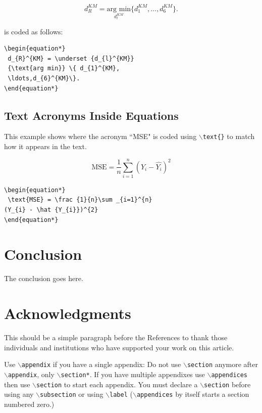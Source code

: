 \documentclass[lettersize,journal]{IEEEtran}
\begin{document}
\begin{equation*} 
  d_{R}^{KM} = \underset {d_{l}^{KM}} {\text{arg min}} \{ d_{1}^{KM},\ldots,d_{6}^{KM}\}.
\end{equation*}

\noindent is coded as follows:
\begin{verbatim}
\begin{equation*} 
 d_{R}^{KM} = \underset {d_{l}^{KM}} 
 {\text{arg min}} \{ d_{1}^{KM},
 \ldots,d_{6}^{KM}\}.
\end{equation*}
\end{verbatim}

\subsection{ Text Acronyms Inside Equations}
This example shows where the acronym ``MSE" is coded using $\backslash${\tt{text\{\}}} to match how it appears in the text.

\begin{equation*}
 \text{MSE} = \frac {1}{n}\sum _{i=1}^{n}(Y_{i} - \hat {Y_{i}})^{2}
\end{equation*}

\begin{verbatim}
\begin{equation*}
 \text{MSE} = \frac {1}{n}\sum _{i=1}^{n}
(Y_{i} - \hat {Y_{i}})^{2}
\end{equation*}
\end{verbatim}

\section{Conclusion}
The conclusion goes here.


\section*{Acknowledgments}
This should be a simple paragraph before the References to thank those individuals and institutions who have supported your work on this article.



{
Use $\backslash${\tt{appendix}} if you have a single appendix:
Do not use $\backslash${\tt{section}} anymore after $\backslash${\tt{appendix}}, only $\backslash${\tt{section*}}.
If you have multiple appendixes use $\backslash${\tt{appendices}} then use $\backslash${\tt{section}} to start each appendix.
You must declare a $\backslash${\tt{section}} before using any $\backslash${\tt{subsection}} or using $\backslash${\tt{label}} ($\backslash${\tt{appendices}} by itself
 starts a section numbered zero.)}
\end{document}
